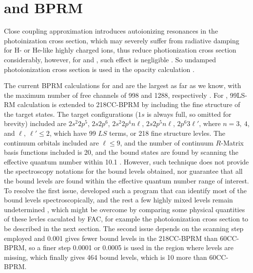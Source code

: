 \section{ and  BPRM} \label{bprm}
Close coupling approximation introduces autoionizing resonances in the photoinization cross section, which may severely suffer from radiative damping for H- or He-like highly charged ions, thus reduce photionization cross section considerably, however, for  and , such effect is negligible \citep{ah_1997, zhang_1998, hsa_1999}. So undamped photoionization cross section is used in the opacity calculation \citep{rmop_5}. 

The current BPRM calculations for  and  are the largest as far as we know, with the maximum number of free channels of 998 and 1288, respectively \citep{rmop_2}. For , 99LS-RM calculation \citep{99cc_2016} is extended to 218CC-BPRM by including the fine structure of the target states. The target configurations ($1s$ is always full, so omitted for brevity) included are ${2s^2 2p^5}$, ${2s 2p^6}$, ${2s^2 2p^4 n\ell}$, ${2s 2p^5 n\ell}$, ${2p^6 3\ell'}$, where $n=3, ~4$, and $\ell,~ \ell'\leq2$, which have 99 $LS$ terms, or 218 fine structure levles. The continuum orbitals included are $\ell\leq 9$, and the number of continuum $R$-Matrix basis functions included is 20, and the bound states are found by scanning the effective quantum number within 10.1 \citep{seaton_bound_1985, berrington_seaton_1985}. However, such technique does not provide the spectroscopy notations for the bound levels obtained, nor guarantee that all the bound levels are found within the effective quantum number range of interest. To resolve the first issue, \citet{nahar_levelid_2000} developed such a program that can identify most of the bound levels spectroscopically, and the rest a few highly mixed levels remain undetermined \citep{nahar_fev_2000}, which might be overcome by comparing some physical quantities of these levles caculated by FAC, for example the photoionization cross section to be described in the next section. The second issue depends on the scanning step employed and 0.001 gives fewer bound levels in the 218CC-BPRM than 60CC-BPRM, so a finer step 0.0001 or 0.0005 is used in the region where levels are missing, which finally gives 464 bound levels, which is 10 more than 60CC-BPRM. 

